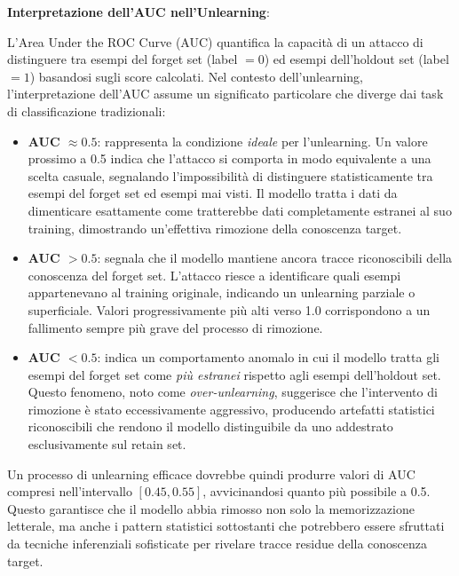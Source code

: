 \textbf{Interpretazione dell'AUC nell'Unlearning}:

L'Area Under the ROC Curve (AUC) quantifica la capacità di un attacco di distinguere tra esempi del forget set (label $=0$) ed esempi dell'holdout set (label $=1$) basandosi sugli score calcolati. Nel contesto dell'unlearning, l'interpretazione dell'AUC assume un significato particolare che diverge dai task di classificazione tradizionali:

\begin{itemize}
    \item \textbf{AUC $\approx 0.5$}: rappresenta la condizione \emph{ideale} per l'unlearning. Un valore prossimo a 0.5 indica che l'attacco si comporta in modo equivalente a una scelta casuale, segnalando l'impossibilità di distinguere statisticamente tra esempi del forget set ed esempi mai visti. Il modello tratta i dati da dimenticare esattamente come tratterebbe dati completamente estranei al suo training, dimostrando un'effettiva rimozione della conoscenza target.
    
    \item \textbf{AUC $> 0.5$}: segnala che il modello mantiene ancora tracce riconoscibili della conoscenza del forget set. L'attacco riesce a identificare quali esempi appartenevano al training originale, indicando un unlearning parziale o superficiale. Valori progressivamente più alti verso 1.0 corrispondono a un fallimento sempre più grave del processo di rimozione.
    
    \item \textbf{AUC $< 0.5$}: indica un comportamento anomalo in cui il modello tratta gli esempi del forget set come \emph{più estranei} rispetto agli esempi dell'holdout set. Questo fenomeno, noto come \emph{over-unlearning}, suggerisce che l'intervento di rimozione è stato eccessivamente aggressivo, producendo artefatti statistici riconoscibili che rendono il modello distinguibile da uno addestrato esclusivamente sul retain set.
\end{itemize}

Un processo di unlearning efficace dovrebbe quindi produrre valori di AUC compresi nell'intervallo $[0.45, 0.55]$, avvicinandosi quanto più possibile a 0.5. Questo garantisce che il modello abbia rimosso non solo la memorizzazione letterale, ma anche i pattern statistici sottostanti che potrebbero essere sfruttati da tecniche inferenziali sofisticate per rivelare tracce residue della conoscenza target.


